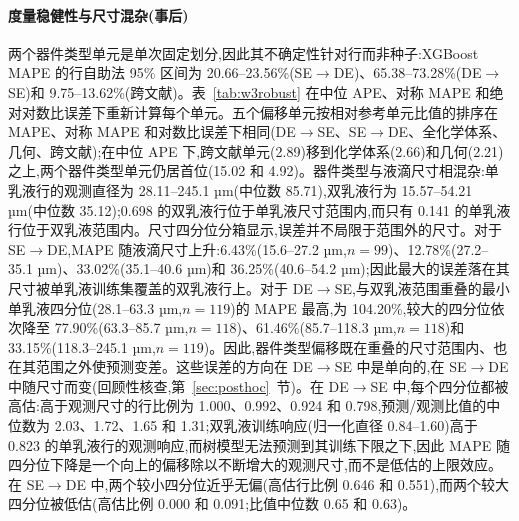\documentclass[11pt,a4paper]{ctexart}
\begin{document}
\paragraph{度量稳健性与尺寸混杂(事后)} 两个器件类型单元是单次固定划分,因此其不确定性针对行而非种子:XGBoost MAPE 的行自助法 95\% 区间为 20.66–23.56\%(SE$\to$DE)、65.38–73.28\%(DE$\to$SE)和 9.75–13.62\%(跨文献)。表~\ref{tab:w3robust} 在中位 APE、对称 MAPE 和绝对对数比误差下重新计算每个单元。五个偏移单元按相对参考单元比值的排序在 MAPE、对称 MAPE 和对数比误差下相同(DE$\to$SE、SE$\to$DE、全化学体系、几何、跨文献);在中位 APE 下,跨文献单元(2.89)移到化学体系(2.66)和几何(2.21)之上,两个器件类型单元仍居首位(15.02 和 4.92)。器件类型与液滴尺寸相混杂:单乳液行的观测直径为 28.11–245.1 µm(中位数 85.71),双乳液行为 15.57–54.21 µm(中位数 35.12);0.698 的双乳液行位于单乳液尺寸范围内,而只有 0.141 的单乳液行位于双乳液范围内。尺寸四分位分箱显示,误差并不局限于范围外的尺寸。对于 SE$\to$DE,MAPE 随液滴尺寸上升:6.43\%(15.6–27.2 µm,$n=99$)、12.78\%(27.2–35.1 µm)、33.02\%(35.1–40.6 µm)和 36.25\%(40.6–54.2 µm);因此最大的误差落在其尺寸被单乳液训练集覆盖的双乳液行上。对于 DE$\to$SE,与双乳液范围重叠的最小单乳液四分位(28.1–63.3 µm,$n=119$)的 MAPE 最高,为 104.20\%,较大的四分位依次降至 77.90\%(63.3–85.7 µm,$n=118$)、61.46\%(85.7–118.3 µm,$n=118$)和 33.15\%(118.3–245.1 µm,$n=119$)。因此,器件类型偏移既在重叠的尺寸范围内、也在其范围之外使预测变差。这些误差的方向在 DE$\to$SE 中是单向的,在 SE$\to$DE 中随尺寸而变(回顾性核查,第~\ref{sec:posthoc}~节)。在 DE$\to$SE 中,每个四分位都被高估:高于观测尺寸的行比例为 1.000、0.992、0.924 和 0.798,预测/观测比值的中位数为 2.03、1.72、1.65 和 1.31;双乳液训练响应(归一化直径 0.84--1.60)高于 0.823 的单乳液行的观测响应,而树模型无法预测到其训练下限之下,因此 MAPE 随四分位下降是一个向上的偏移除以不断增大的观测尺寸,而不是低估的上限效应。在 SE$\to$DE 中,两个较小四分位近乎无偏(高估行比例 0.646 和 0.551),而两个较大四分位被低估(高估比例 0.000 和 0.091;比值中位数 0.65 和 0.63)。
\end{document}
